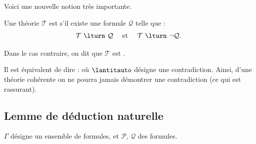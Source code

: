 \documentclass[11pt,class=report,crop=false]{standalone}
\begin{document}
Voici une nouvelle notion très importante.

\begin{definition}
	Une théorie $\mathcal{T}$ est  s'il existe une formule $\mathcal{Q}$ telle que :
	\[
	\mathcal{T} \ \lturn \ \mathcal{Q} \quad \text{ et } \quad \mathcal{T} \ \lturn \ \lnot \mathcal{Q}.
	\] 
	
	Dans le cas contraire, on dit que $\mathcal{T}$ est . 
\end{definition}

Il est équivalent de dire : 
où $\lantitauto$ désigne une contradiction.
Ainsi, d'une théorie cohérente on ne pourra jamais démontrer une contradiction (ce qui est rassurant).



\subsection{Lemme de déduction naturelle}

$\Gamma$ désigne un ensemble de formules, et $\mathcal{P}$, $\mathcal{Q}$ des formules.
\begin{lemme} 
	\sauteligne
\end{lemme}
\end{document}

